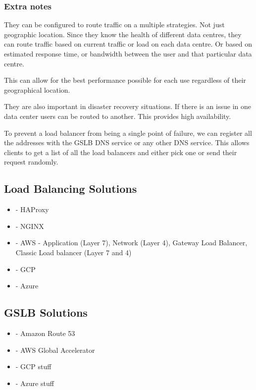 \documentclass[a4paper, 11pt]{book}
\begin{document}
    \subsubsection{Extra notes}
    They can be configured to route traffic on a multiple strategies.
    Not just geographic location.
    Since they know the health of different data centres, they can route traffic based on current traffic or load on each data centre.
    Or based on estimated response time, or bandwidth between the user and that particular data centre.

    This can allow for the best performance possible for each use regardless of their geographical location.

    They are also important in disaster recovery situations.
    If there is an issue in one data center users can be routed to another.
    This provides high availability.

    To prevent a load balancer from being a single point of failure, we can register all the addresses with the GSLB DNS service or any other DNS service.
    This allows clients to get a list of all the load balancers and either pick one or send their request randomly.

    \subsection{Load Balancing Solutions}
    \begin{itemize}
        \item - HAProxy
        \item - NGINX
        \item - AWS - Application (Layer 7), Network (Layer 4), Gateway Load Balancer, Classic Load balancer (Layer 7 and 4)
        \item - GCP %
        \item - Azure %
    \end{itemize}

    \subsection{GSLB Solutions}
    \begin{itemize}
        \item - Amazon Route 53
        \item - AWS Global Accelerator
        \item - GCP stuff
        \item - Azure stuff
    \end{itemize}
\end{document}
